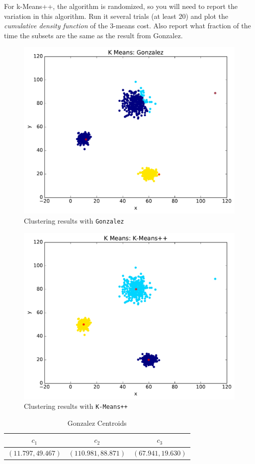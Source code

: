 \documentclass[11pt]{article}
\begin{document}
For \textsf{k-Means++}, the algorithm is randomized, so you will need to report the variation in this algorithm.  Run it several trials (at least $20$) and plot the \emph{cumulative density function} of the $3$-means cost.  
Also report what fraction of the time the subsets are the same as the result from \textsf{Gonzalez}.  

\begin{figure}[H]
\centering
\includegraphics[width=.75\textwidth]{gonzalez.pdf}
\caption{Clustering results with {\tt Gonzalez}}
\end{figure}



\begin{figure}[H]
\centering
\includegraphics[width=.75\textwidth]{kmeanspp.pdf}
\caption{Clustering results with {\tt K-Means++}}
\end{figure}



\begin{table}[H]
\centering
\caption{Gonzalez Centroids}
\begin{tabular}{c c c}
\hline\hline
$c_{1}$ & $c_{2}$ & $c_{3}$\\
\hline
$(11.797, 49.467)$ & $(110.981, 88.871)$ & $(67.941, 19.630)$\\
\hline
\end{tabular}
\end{table}
\end{document}
